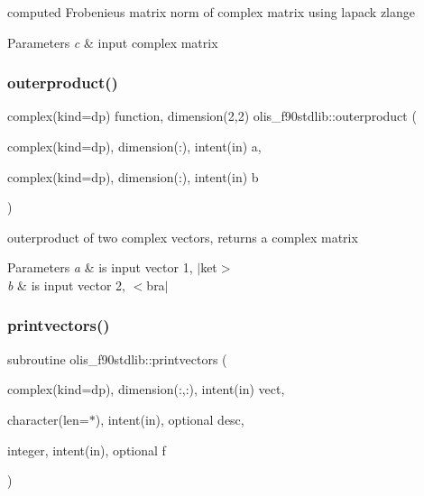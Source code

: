 computed Frobenieus matrix norm of complex matrix using lapack zlange 


\begin{DoxyParams}{Parameters}
{\em c} & input complex matrix \\
\hline
\end{DoxyParams}
\mbox{\label{namespaceolis__f90stdlib_a9b646e61678500e78a9c48747a07bdf0}} 
\subsubsection{\texorpdfstring{outerproduct()}{outerproduct()}}
{\footnotesize\ttfamily complex(kind=dp) function, dimension(2,2) olis\+\_\+f90stdlib\+::outerproduct (\begin{DoxyParamCaption}\item[{complex(kind=dp), dimension(\+:), intent(in)}]{a,  }\item[{complex(kind=dp), dimension(\+:), intent(in)}]{b }\end{DoxyParamCaption})}



outerproduct of two complex vectors, returns a complex matrix 


\begin{DoxyParams}{Parameters}
{\em a} & is input vector 1, $\vert$ket$>$ \\
\hline
{\em b} & is input vector 2, $<$bra$\vert$ \\
\hline
\end{DoxyParams}
\mbox{\label{namespaceolis__f90stdlib_a9780b39329025edfdef71ce07e250808}} 
\subsubsection{\texorpdfstring{printvectors()}{printvectors()}}
{\footnotesize\ttfamily subroutine olis\+\_\+f90stdlib\+::printvectors (\begin{DoxyParamCaption}\item[{complex(kind=dp), dimension(\+:,\+:), intent(in)}]{vect,  }\item[{character(len=$\ast$), intent(in), optional}]{desc,  }\item[{integer, intent(in), optional}]{f }\end{DoxyParamCaption})}



